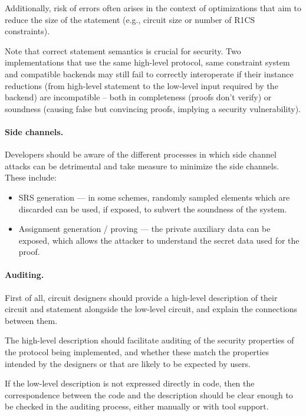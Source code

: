 Additionally, risk of errors often arises in the context of optimizations that aim to reduce the size of the statement (e.g., circuit size or number of R1CS constraints).

Note that correct statement semantics is crucial for security. Two implementations that use the same high-level protocol, same constraint system and compatible backends may still fail to correctly interoperate if their instance reductions (from high-level statement to the low-level input required by the backend) are incompatible -- both in completeness (proofs don’t verify) or soundness (causing false but convincing proofs, implying a security vulnerability).


\paragraph{Side channels.}
Developers should be aware of the different processes in which side channel attacks can be detrimental and take measure to minimize the side channels. These include:
\begin{itemize}[label={- }]
    \item SRS generation --- in some schemes, randomly sampled elements which are discarded can be used, if exposed, to subvert the soundness of the system.
    \item Assignment generation / proving --- the private auxiliary data can be exposed, which allows the attacker to understand the secret data used for the proof.
\end{itemize}


\paragraph{Auditing.}

First of all, circuit designers should provide a high-level description of their circuit and statement
alongside the low-level circuit, and explain the connections between them.             

The high-level description should facilitate auditing of the security properties of the protocol
being implemented, and whether these match the properties intended by the designers or that are likely to be expected by users.

If the low-level description is not expressed directly in code, then the correspondence between the code and the description should be clear enough to be checked in the auditing process, either manually or with tool support.

